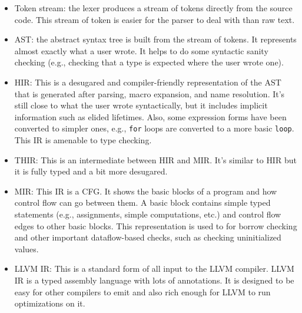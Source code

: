 \documentclass{article}
\begin{document}
\begin{itemize}
    \item Token stream: the lexer produces a stream of tokens directly from the source code. This stream of token is easier for the parser to deal with than raw text.
    \item \ac{AST}: the abstract syntax tree is built from the stream of tokens. It represents almost exactly what a user wrote. It helps to do some syntactic sanity checking (e.g., checking that a type is expected where the user wrote one).
    \item \ac{HIR}: This is a desugared and compiler-friendly representation of the \ac{AST} that is generated after parsing, macro expansion, and name resolution. It's still close to what the user wrote syntactically, but it includes implicit information such as elided lifetimes. Also, some expression forms have been converted to simpler ones, e.g., \lstinline{for} loops are converted to a more basic \lstinline{loop}. This \ac{IR} is amenable to type checking. 
    \item \ac{THIR}: This is an intermediate between \ac{HIR} and \ac{MIR}. It's similar to \ac{HIR} but it is fully typed and a bit more desugared.
    \item \ac{MIR}: This \ac{IR} is a \ac{CFG}. It shows the basic blocks of a program and how control flow can go between them. A basic block contains simple typed statements (e.g., assignments, simple computations, etc.) and control flow edges to other basic blocks. This representation is used to for borrow checking and other important dataflow-based checks, such as checking uninitialized values. 
    \item LLVM \ac{IR}: This is a standard form of all input to the LLVM compiler. LLVM \ac{IR} is a typed assembly language with lots of annotations. It is designed to be easy for other compilers to emit and also rich enough for LLVM to run optimizations on it. 
\end{itemize}
\end{document}
